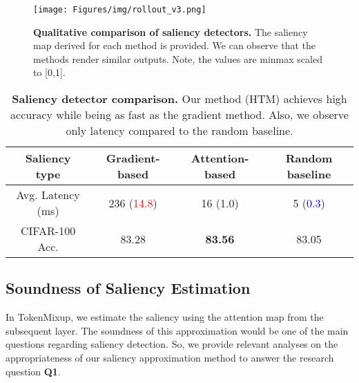 \documentclass{article}
\begin{document}
\begin{figure}[t]
\begin{center}
\texttt{[image: Figures/img/rollout\_v3.png]}
\end{center}
\vspace{-3mm}
\caption{\footnotesize \textbf{Qualitative comparison of saliency detectors.} The saliency map derived for each method is provided. We can observe that the methods render similar outputs. Note, the values are minmax scaled to [0,1].}
\label{fig:rollout}
\end{figure} \begin{table}

\centering
\caption{\footnotesize \textbf{Saliency detector comparison.} Our method (HTM) achieves high accuracy while being  as fast as the gradient method. Also, we observe only  latency compared to the random baseline.}
\label{tab:saliency_map}
\begin{adjustbox}{width=0.8\textwidth}
\begin{tabular}{c|ccc}
\hline
\rule{0pt}{1.0\normalbaselineskip}
\cellcolor{gray!10}Saliency type & \cellcolor{gray!10}\textbf{Gradient-based} & \cellcolor{gray!10}\textbf{Attention-based} &\cellcolor{gray!10} \textbf{Random baseline} 
\rule{0pt}{1.0\normalbaselineskip}\\
\hline
\rule{0pt}{1.0\normalbaselineskip}
Avg. Latency (ms) & 236 {\footnotesize (\textcolor{red}{14.8})} & 16 {\footnotesize (1.0)} & 5 {\footnotesize (\textcolor{blue}{0.3})} \rule{0pt}{1.0\normalbaselineskip}\\
\rule{0pt}{1.0\normalbaselineskip}
CIFAR-100 Acc. & 83.28 &  \textbf{83.56} & 83.05
\rule{0pt}{1.0\normalbaselineskip}\\ \hline
\end{tabular}
\end{adjustbox}
\end{table}

%
 \subsection{Soundness of Saliency Estimation}
\label{sec:sal_sound}
\vspace{-2mm}
In TokenMixup, we estimate the saliency using the attention map from the subsequent layer.
The soundness of this approximation would be one of the main questions regarding saliency detection.
So, we provide relevant analyses on the appropriateness of our saliency approximation method to answer the research question \textbf{Q1}.
\end{document}
